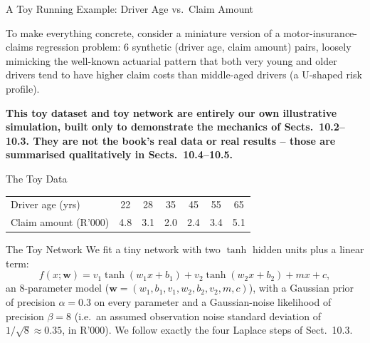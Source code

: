 \documentclass[aspectratio=169,10pt]{beamer}
\newcommand{\bw}{\mathbf{w}}
\begin{document}
\begin{frame}[allowframebreaks]{A Toy Running Example: Driver Age vs.\ Claim Amount}

To make everything concrete, consider a miniature version of a
motor-insurance-claims regression problem: 6 synthetic (driver age, claim
amount) pairs, loosely mimicking the well-known actuarial pattern that both
very young and older drivers tend to have higher claim costs than
middle-aged drivers (a U-shaped risk profile).

\textbf{This toy dataset and toy network are entirely our own illustrative
simulation, built only to demonstrate the mechanics of Sects.\ 10.2--10.3.
They are not the book's real data or real results -- those are summarised
qualitatively in Sects.\ 10.4--10.5.}

  \begin{exampleblock}{The Toy Data}
    \begin{center}
    \begin{tabular}{lcccccc}
      \toprule
      Driver age (yrs)  & 22  & 28  & 35  & 45  & 55  & 65 \\
      Claim amount (R'000) & 4.8 & 3.1 & 2.0 & 2.4 & 3.4 & 5.1 \\
      \bottomrule
    \end{tabular}
    \end{center}
  \end{exampleblock}

  \begin{block}{The Toy Network}
    We fit a tiny network with two $\tanh$ hidden units plus a linear term:
    \[
      f(x;\bw) = v_1 \tanh(w_1 x + b_1) + v_2 \tanh(w_2 x + b_2) + m x + c,
    \]
    an 8-parameter model ($\bw = (w_1,b_1,v_1,w_2,b_2,v_2,m,c)$), with a
    Gaussian prior of precision $\alpha=0.3$ on every parameter and a
    Gaussian-noise likelihood of precision $\beta=8$ (i.e.\ an assumed
    observation noise standard deviation of $1/\sqrt{8}\approx0.35$, in
    R'000). We follow exactly the four Laplace steps of Sect.\ 10.3.
  \end{block}

  \framebreak


\end{frame}
\end{document}
